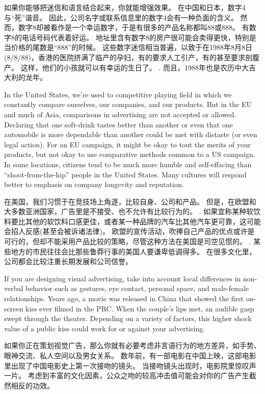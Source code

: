 \documentclass[cs4size, a4paper, 12pt]{article}
\newcounter{numpar}
\newcommand*{\newpar}{\numpar{}}
\begin{document}
	如果你能够把迷信和语言结合起来，你就能增强效果。 在中国和日本，数字4与``死''谐音。 因此，公司名字或联系信息里的数字4会有一种负面的含义。 然而，数字8却被看作是一个幸运数字，于是有很多的产品名称都叫88或888。 有数字8的电话号码代表着好运。 地址里含有数字8的房产很可能会卖得更快，特别是当价格的尾数是``888''的时候。 这些数字迷信相当普遍，以致于在1988年8月8日(8/8/88)，香港的医院挤满了临产的孕妇，有的要求人工引产，有的甚至要求剖腹产。 这样，他们的小孩就可以有幸运的生日了。 . 而且，1988年也是农历中大吉大利的龙年。 
	
	\newpar In the United States, we’re used to competitive playing field in which we constantly compare ourselves, our companies, and our products. But in the EU and much of Asia, comparisons in advertising are not accepted or allowed. Declaring that one soft-drink tastes better than another or even that one automobile is more dependable than another could be met with distaste (or even legal action). For an EU campaign, it might be okay to tout the merits of your products, but not okay to use comparative methods common to a US campaign. In some locations, citizens tend to be much more humble and self-effacing than ``shoot-from-the-hip'' people in the United States. Many cultures will respond better to emphasis on company longevity and reputation.
	
	在美国，我们习惯于在竞技场上角逐，比较自身、公司和产品。 但是，在欧盟和大多数亚洲国家，广告里是不接受、也不允许有比较行为的。 . 如果宜称某种软饮料要比其他的软饮料口感更佳，或者某一种品牌的汽车比其他汽车更可靠，这可能会招人反感(甚至会被诉诸法律)。 欧盟的宣传活动，吹捧自己产品的优点或许是可行的，但却不能采用产品比较的策略，尽管这种方法在美国是司空见惯的。 . 某些地方的市民往往会比那些鲁莽行事的美国人要谦卑低调得多。 在很多文化里，公司都会比较注重长期发展和公司信誉。 
	
	\newpar If you are designing visual advertising, take into account local differences in non-verbal behavior such as gestures, eye contact, personal space, and male-female relationships. Years ago, a movie was released in China that showed the first on-screen kiss ever filmed in the PRC. When the couple's lips met, an audible gasp swept through the theater. Depending on a variety of factors, this higher shock value of a public kiss could work for or against your advertising.
	
	如果你正在策划视觉广告，那么你就有必要考虑非言语行为的地方差异，如手势、眼神交流、私人空间以及男女关系。 数年前，有一部电影在中国上映，这部电影里出现了中国电影史上第一次接吻的镜头。 当接吻镜头出现时，电影院里惊叹声一片。 考虑到丰富的文化因素，公众之吻的较高冲击值可能会对你的广告产生截然相反的功效。 
	
\end{document}
